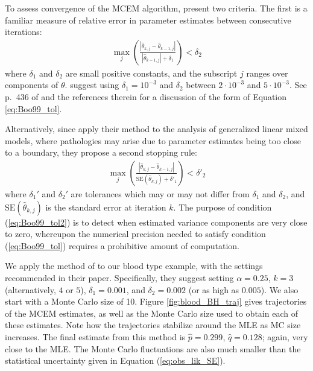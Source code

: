 \documentclass[11pt, oneside]{article}   	%
\begin{document}
To assess convergence of the MCEM algorithm, \citeauthor{Boo99} present two criteria. The first is a familiar measure of relative error in parameter estimates between consecutive iterations:
%
\begin{align}
    \max_j \left( \frac{\left| \hat{\theta}_{k, j} - \hat{\theta}_{k-1,j} \right|}{\left| \hat{\theta}_{k-1,j} \right| + \delta_1} \right) < \delta_2 \label{eq:Boo99_tol}
\end{align}
%
where $\delta_1$ and $\delta_2$ are small positive constants, and the subscript $j$ ranges over components of $\theta$. \citeauthor{Boo99} suggest using $\delta_1 = 10^{-3}$ and $\delta_2$ between $2 \cdot 10^{-3}$ and $5 \cdot 10^{-3}$. See p.\ 436 of \citet{Sea06} and the references therein for a discussion of the form of Equation \ref{eq:Boo99_tol}.

Alternatively, since \citeauthor{Boo99} apply their method to the analysis of generalized linear mixed models, where pathologies may arise due to parameter estimates being too close to a boundary, they propose a second stopping rule:
%
\begin{align}
    \max_j \left( \frac{\left| \hat{\theta}_{k, j} - \hat{\theta}_{k-1,j} \right|}{\mathrm{SE}\left(\hat{\theta}_{k,j}\right) + \delta'_1} \right) < \delta'_2 \label{eq:Boo99_tol2}
\end{align}
%
where $\delta_1'$ and $\delta_2'$ are tolerances which may or may not differ from $\delta_1$ and $\delta_2$, and $\mathrm{SE}\left(\hat{\theta}_{k,j}\right)$ is the standard error at iteration $k$. The purpose of condition (\ref{eq:Boo99_tol2}) is to detect when estimated variance components are very close to zero, whereupon the numerical precision needed to satisfy condition (\ref{eq:Boo99_tol}) requires a prohibitive amount of computation.

We apply the method of \citeauthor{Boo99} to our blood type example, with the settings recommended in their paper. Specifically, they suggest setting $\alpha = 0.25$, $k = 3$ (alternatively, $4$ or $5$), $\delta_1 = 0.001$, and $\delta_2 = 0.002$ (or as high as $0.005$). We also start with a Monte Carlo size of 10. Figure \ref{fig:blood_BH_traj} gives trajectories of the MCEM estimates, as well as the Monte Carlo size used to obtain each of these estimates. Note how the trajectories stabilize around the MLE as MC size increases. The final estimate from this method is $\hat{p} = 0.299$, $\hat{q} = 0.128$; again, very close to the MLE. The Monte Carlo fluctuations are also much smaller than the statistical uncertainty given in Equation (\ref{eq:obs_lik_SE}).
\end{document}
